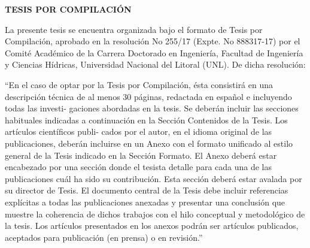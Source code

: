 \newpage
\thispagestyle{empty}
\vspace*{3em}
{\hfill\large \textbf{TESIS POR COMPILACIÓN}\hfill\mbox{}}
\vspace{1em}

La presente tesis se encuentra organizada bajo el formato de Tesis por Compilación,
aprobado en la resolución No 255/17 (Expte. No 888317-17) por el Comité Académico
de la Carrera Doctorado en Ingeniería, Facultad de Ingeniería y Ciencias Hídricas,
Universidad Nacional del Litoral (UNL). De dicha resolución:

``En el caso de optar por la Tesis por Compilación, ésta consistirá en una descripción
técnica de al menos 30 páginas, redactada en español e incluyendo todas las investi-
gaciones abordadas en la tesis. Se deberán incluir las secciones habituales indicadas
a continuación en la Sección Contenidos de la Tesis. Los artículos científicos publi-
cados por el autor, en el idioma original de las publicaciones, deberán incluirse en
un Anexo con el formato unificado al estilo general de la Tesis indicado en la Sección
Formato. El Anexo deberá estar encabezado por una sección donde el tesista detalle
para cada una de las publicaciones cuál ha sido su contribución. Esta sección deberá
estar avalada por su director de Tesis. El documento central de la Tesis debe incluir
referencias explícitas a todas las publicaciones anexadas y presentar una conclusión
que muestre la coherencia de dichos trabajos con el hilo conceptual y metodológico
de la tesis. Los artículos presentados en los anexos podrán ser artículos publicados,
aceptados para publicación (en prensa) o en revisión.''
